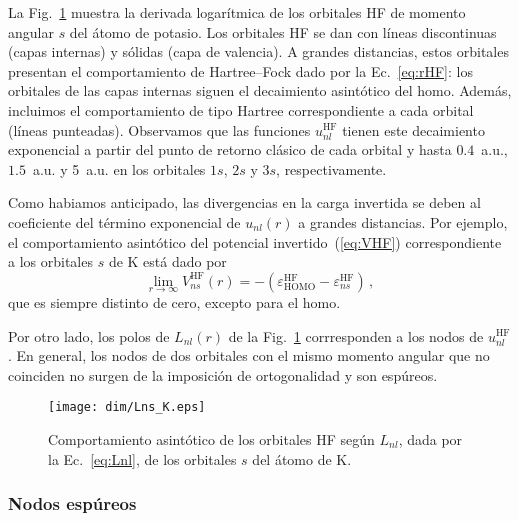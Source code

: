 La Fig.~\ref{fig:LnsK} muestra la derivada logarítmica de los orbitales 
HF de momento angular $s$ del átomo de potasio. Los orbitales HF se dan 
con líneas discontinuas (capas internas) y sólidas (capa de valencia). A 
grandes distancias, estos orbitales presentan el comportamiento de 
Hartree--Fock dado por la Ec.~\ref{eq:rHF}: los orbitales de las capas 
internas siguen el decaimiento asintótico del \acs{homo}. Además, 
incluimos el comportamiento de tipo Hartree correspondiente a cada 
orbital (líneas punteadas). Observamos que las funciones 
$u_{nl}^{\mathrm{HF}}$ tienen este decaimiento exponencial a partir del 
punto de retorno clásico de cada orbital y hasta $0.4$~a.u., $1.5$~a.u. 
y 5~a.u. en los orbitales $1s$, $2s$ y $3s$, respectivamente. 

Como habiamos anticipado, las divergencias en la carga invertida se 
deben al coeficiente del término exponencial de $u_{nl}(r)$ a grandes 
distancias. Por ejemplo, el comportamiento asintótico del potencial 
invertido~(\ref{eq:VHF}) correspondiente a los orbitales $s$ de K está 
dado por
\begin{equation}
\lim_{r \rightarrow \infty} V_{ns}^{\mathrm{HF}}(r)=
-\left(\varepsilon_{\mathrm{HOMO}}^{\mathrm{HF}}
-\varepsilon_{ns}^{\mathrm{HF}}\right) \,,
\label{eq:asintoticoVHF}
\end{equation}
que es siempre distinto de cero, excepto para el \acs{homo}.

Por otro lado, los polos de $L_{nl}(r)$ de la Fig.~\ref{fig:LnsK}  
corrresponden a los nodos de $u_{nl}^{\mathrm{HF}}$. En general, los 
nodos de dos orbitales con el mismo momento angular que no coinciden no 
surgen de la imposición de ortogonalidad y son espúreos. 

\begin{figure}
\centering
\texttt{[image: dim/Lns\_K.eps]} 
\caption[Comportamiento asintótico de los orbitales HF.]
{Comportamiento asintótico de los orbitales HF según $L_{nl}$, dada por 
la Ec.~\ref{eq:Lnl}, de los orbitales $s$ del átomo de K.}
\label{fig:LnsK}
\end{figure}

\subsubsection{Nodos espúreos}
\label{subsubsec:espureos}

